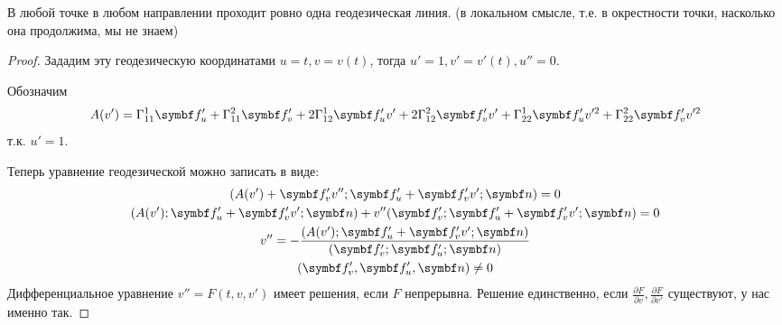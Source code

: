 \documentclass[main]{subfiles}
\begin{document}
\begin{theorem}
    В любой точке в любом направлении проходит ровно одна геодезическая линия.
    (в локальном смысле, т.е. в окрестности точки, насколько она продолжима, мы не знаем)
\end{theorem}
\begin{proof}
    Зададим эту геодезическую координатами $u = t, v = v(t)$,
    тогда $u'=1, v' = v'(t), u''=0$.

    Обозначим
    \[
        A(v') = \Gamma^1_{11} \vf'_u + \Gamma^2_{11} \vf'_v
        +2 \Gamma^1_{12} \vf'_u v' + 2 \Gamma^2_{12} \vf'_v v'
        + \Gamma^1_{22} \vf'_u  v'^2+ \Gamma^2_{22} \vf'_v v'^2
    \]
    т.к. $u' = 1$.

    Теперь уравнение геодезической можно записать в виде:
    \begin{gather*}
        (A(v') + \vf'_v v''; \vf'_u + \vf'_v v'; \vn) = 0\\
        (A(v'); \vf'_u + \vf'_v v'; \vn) + v''(\vf'_v; \vf'_u+ \vf'_v v';\vn) = 0\\
        v'' = - \frac{(A(v'); \vf'_u + \vf'_v v'; \vn)}{(\vf'_v; \vf'_u; \vn)} \\
        (\vf'_v, \vf'_u, \vn) \neq 0
    \end{gather*}
    Дифференциальное уравнение $v'' = F(t,v,v')$ имеет решения, если $F$ непрерывна.
    Решение единственно, если $\frac{\partial F}{\partial v}, \frac{\partial F}{\partial v'}$ существуют, у нас именно так.
\end{proof}
\end{document}
